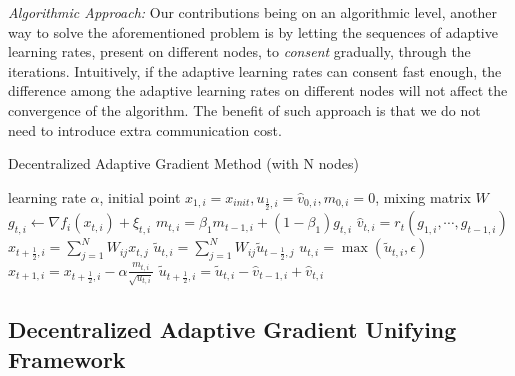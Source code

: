 \documentclass{article} %
\begin{document}
\textit{Algorithmic Approach:} Our contributions being on an algorithmic level, another way to solve the aforementioned problem is by letting the sequences of adaptive learning rates, present on different nodes, to \emph{consent} gradually, through the iterations. 
Intuitively, if the adaptive learning rates can consent fast enough, the difference among the adaptive learning rates on different nodes will not affect the convergence of the algorithm.  
The benefit of such approach is that we do not need to introduce extra communication cost.
\begin{algorithm}[t]
	\caption{Decentralized Adaptive Gradient Method (with N nodes)}
	\label{alg: dadaptive}
	\begin{algorithmic}[1]
		 learning rate $\alpha$, initial point $x_{1,i} = x_{init}, u_{\frac{1}{2},i} = \hat v_{0,i}, m_{0,i}=0$, mixing matrix $W$
		\STATE  $g_{t,i}  \leftarrow \nabla f_i(x_{t,i}) + \xi_{t,i}$
		\STATE $m_{t,i} = \beta_1 m_{t-1,i} + (1-\beta_1) g_{t,i}$ 
		\STATE $\hat v_{t,i} = r_t(g_{1,i},\cdots,g_{t-1,i})$
		\STATE $x_{t+\frac{1}{2},i} = \sum_{j=1}^N W_{ij}x_{t,j}$
	    \STATE $\tilde u_{t,i} = \sum_{j=1}^N W_{ij} \tilde u_{t-\frac{1}{2},j}$
	    \STATE $u_{t,i} = \max(\tilde u_{t,i}, \epsilon)$
		\STATE $x_{t+1,i} = x_{t+\frac{1}{2},i} - \alpha \frac{m_{t,i}}{\sqrt{u_{t,i}}}$
		\STATE $\tilde u_{t+\frac{1}{2},i} = \tilde u_{t,i} - \hat v_{t-1,i} + \hat v_{t,i}$
		\ENDFAP
		\ENDFOR
	\end{algorithmic}
\end{algorithm}

\vspace{-0.05in}
\subsection{Decentralized Adaptive Gradient Unifying Framework}
\vspace{-0.05in}
\end{document}
